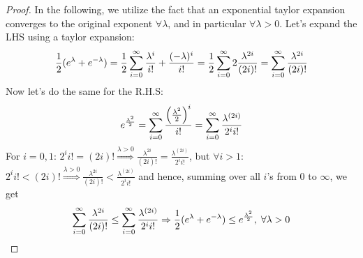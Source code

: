 \subsubsection{}
\begin{proof}
    In the following, we utilize the fact that an exponential taylor expansion converges to the original exponent $\forall \lambda$, and in particular $\forall \lambda>0$.
    Let's expand the LHS using a taylor expansion:
    \begin{equation*}
        \frac{1}{2} (e^\lambda + e^{-\lambda}) = \frac{1}{2} \sum_{i=0}^{\infty} \frac{\lambda^i}{i!} + \frac{(-\lambda)^i}{i!} 
        = \frac{1}{2} \sum_{i=0}^{\infty} 2\frac{\lambda^{2i}}{(2i)!} = \sum_{i=0}^{\infty} \frac{\lambda^{2i}}{(2i)!}
    \end{equation*}
    Now let's do the same for the R.H.S:
    \begin{equation*}
        e^{\frac{\lambda^2}{2}} = \sum_{i=0}^{\infty} \frac{\left(\frac{\lambda^2}{2}\right)^i}{i!} = 
        \sum_{i=0}^{\infty} \frac{\lambda^{(2i)}}{2^i i!}
    \end{equation*}
    For $i=0, 1$: $2^i i! = (2i)! \overset{\lambda > 0}{\Rightarrow}\frac{\lambda^{2i}}{(2i)!} = \frac{\lambda^{(2i)}}{2^i i!}$, but $\forall i>1$: $2^i i! < (2i)! \overset{\lambda > 0}{\Rightarrow} \frac{\lambda^{2i}}{(2i)!} < \frac{\lambda^{(2i)}}{2^i i!}$ 
    and hence, summing over all $i$'s from 0 to $\infty$, we get 
    \begin{equation*}
        \sum_{i=0}^{\infty} \frac{\lambda^{2i}}{(2i)!} \leq \sum_{i=0}^{\infty} \frac{\lambda^{(2i)}}{2^i i!} \Rightarrow
        \frac{1}{2} (e^\lambda + e^{-\lambda}) \leq e^{\frac{\lambda^2}{2}}, \; \forall \lambda > 0
    \end{equation*}
\end{proof}

